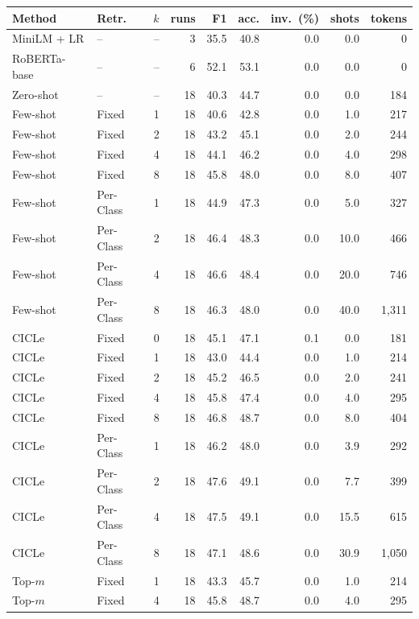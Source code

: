 \begin{tabular}{llrrrrrrr}
\toprule
Method & Retr. & $k$ & runs & F1 & acc. & inv.\ (\%) & shots & tokens \\
\midrule
MiniLM + LR & -- & -- & 3 & 35.5 & 40.8 & 0.0 & 0.0 & 0 \\
RoBERTa-base & -- & -- & 6 & 52.1 & 53.1 & 0.0 & 0.0 & 0 \\
\midrule
Zero-shot & -- & -- & 18 & 40.3 & 44.7 & 0.0 & 0.0 & 184 \\
\midrule
Few-shot & Fixed & 1 & 18 & 40.6 & 42.8 & 0.0 & 1.0 & 217 \\
Few-shot & Fixed & 2 & 18 & 43.2 & 45.1 & 0.0 & 2.0 & 244 \\
Few-shot & Fixed & 4 & 18 & 44.1 & 46.2 & 0.0 & 4.0 & 298 \\
Few-shot & Fixed & 8 & 18 & 45.8 & 48.0 & 0.0 & 8.0 & 407 \\
Few-shot & Per-Class & 1 & 18 & 44.9 & 47.3 & 0.0 & 5.0 & 327 \\
Few-shot & Per-Class & 2 & 18 & 46.4 & 48.3 & 0.0 & 10.0 & 466 \\
Few-shot & Per-Class & 4 & 18 & 46.6 & 48.4 & 0.0 & 20.0 & 746 \\
Few-shot & Per-Class & 8 & 18 & 46.3 & 48.0 & 0.0 & 40.0 & 1,311 \\
CICLe & Fixed & 0 & 18 & 45.1 & 47.1 & 0.1 & 0.0 & 181 \\
CICLe & Fixed & 1 & 18 & 43.0 & 44.4 & 0.0 & 1.0 & 214 \\
CICLe & Fixed & 2 & 18 & 45.2 & 46.5 & 0.0 & 2.0 & 241 \\
CICLe & Fixed & 4 & 18 & 45.8 & 47.4 & 0.0 & 4.0 & 295 \\
CICLe & Fixed & 8 & 18 & 46.8 & 48.7 & 0.0 & 8.0 & 404 \\
CICLe & Per-Class & 1 & 18 & 46.2 & 48.0 & 0.0 & 3.9 & 292 \\
CICLe & Per-Class & 2 & 18 & 47.6 & 49.1 & 0.0 & 7.7 & 399 \\
CICLe & Per-Class & 4 & 18 & 47.5 & 49.1 & 0.0 & 15.5 & 615 \\
CICLe & Per-Class & 8 & 18 & 47.1 & 48.6 & 0.0 & 30.9 & 1,050 \\
\midrule
Top-$m$ & Fixed & 1 & 18 & 43.3 & 45.7 & 0.0 & 1.0 & 214 \\
Top-$m$ & Fixed & 4 & 18 & 45.8 & 48.7 & 0.0 & 4.0 & 295 \\

\end{tabular}
